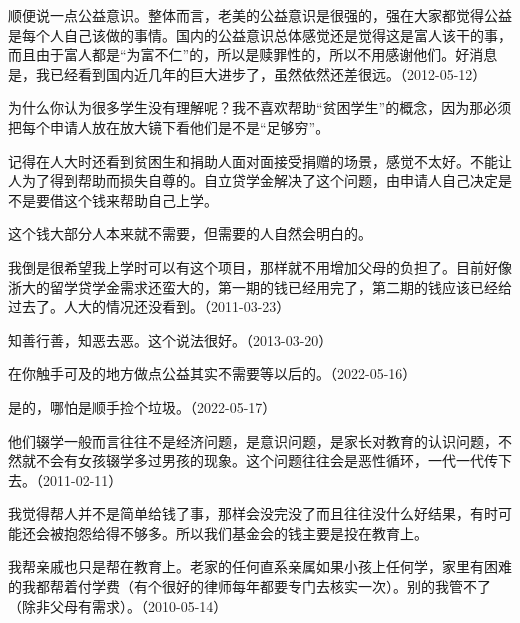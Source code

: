 顺便说一点公益意识。整体而言，老美的公益意识是很强的，强在大家都觉得公益是每个人自己该做的事情。国内的公益意识总体感觉还是觉得这是富人该干的事，而且由于富人都是“为富不仁”的，所以是赎罪性的，所以不用感谢他们。好消息是，我已经看到国内近几年的巨大进步了，虽然依然还差很远。（2012-05-12）


为什么你认为很多学生没有理解呢？我不喜欢帮助“贫困学生”的概念，因为那必须把每个申请人放在放大镜下看他们是不是“足够穷”。

记得在人大时还看到贫困生和捐助人面对面接受捐赠的场景，感觉不太好。不能让人为了得到帮助而损失自尊的。自立贷学金解决了这个问题，由申请人自己决定是不是要借这个钱来帮助自己上学。

这个钱大部分人本来就不需要，但需要的人自然会明白的。

我倒是很希望我上学时可以有这个项目，那样就不用增加父母的负担了。目前好像浙大的留学贷学金需求还蛮大的，第一期的钱已经用完了，第二期的钱应该已经给过去了。人大的情况还没看到。（2011-03-23）


知善行善，知恶去恶。这个说法很好。（2013-03-20）


在你触手可及的地方做点公益其实不需要等以后的。（2022-05-16）


是的，哪怕是顺手捡个垃圾。（2022-05-17）


他们辍学一般而言往往不是经济问题，是意识问题，是家长对教育的认识问题，不然就不会有女孩辍学多过男孩的现象。这个问题往往会是恶性循环，一代一代传下去。（2011-02-11）


我觉得帮人并不是简单给钱了事，那样会没完没了而且往往没什么好结果，有时可能还会被抱怨给得不够多。所以我们基金会的钱主要是投在教育上。

我帮亲戚也只是帮在教育上。老家的任何直系亲属如果小孩上任何学，家里有困难的我都帮着付学费（有个很好的律师每年都要专门去核实一次）。别的我管不了（除非父母有需求）。（2010-05-14）

